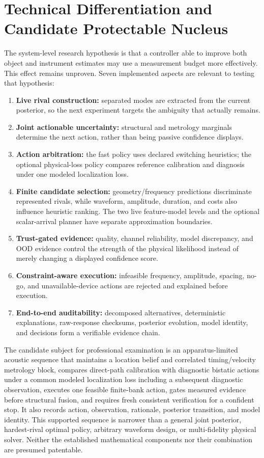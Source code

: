 \documentclass[conference]{IEEEtran}
\begin{document}
\section{Technical Differentiation and Candidate Protectable Nucleus}
The system-level research hypothesis is that a controller able to improve both object and instrument estimates may use a measurement budget more effectively. This effect remains unproven. Seven implemented aspects are relevant to testing that hypothesis:
\begin{enumerate}
    \item \textbf{Live rival construction:} separated modes are extracted from the current posterior, so the next experiment targets the ambiguity that actually remains.
    \item \textbf{Joint actionable uncertainty:} structural and metrology marginals determine the next action, rather than being passive confidence displays.
    \item \textbf{Action arbitration:} the fast policy uses declared switching heuristics; the optional physical-loss policy compares reference calibration and diagnosis under one modeled localization loss.
    \item \textbf{Finite candidate selection:} geometry/frequency predictions discriminate represented rivals, while waveform, amplitude, duration, and costs also influence heuristic ranking. The two live feature-model levels and the optional scalar-arrival planner have separate approximation boundaries.
    \item \textbf{Trust-gated evidence:} quality, channel reliability, model discrepancy, and OOD evidence control the strength of the physical likelihood instead of merely changing a displayed confidence score.
    \item \textbf{Constraint-aware execution:} infeasible frequency, amplitude, spacing, no-go, and unavailable-device actions are rejected and explained before execution.
    \item \textbf{End-to-end auditability:} decomposed alternatives, deterministic explanations, raw-response checksums, posterior evolution, model identity, and decisions form a verifiable evidence chain.
\end{enumerate}

The candidate subject for professional examination is an apparatus-limited acoustic sequence that maintains a location belief and correlated timing/velocity metrology block, compares direct-path calibration with diagnostic bistatic actions under a common modeled localization loss including a subsequent diagnostic observation, executes one feasible finite-bank action, gates measured evidence before structural fusion, and requires fresh consistent verification for a confident stop. It also records action, observation, rationale, posterior transition, and model identity. This supported sequence is narrower than a general joint posterior, hardest-rival optimal policy, arbitrary waveform design, or multi-fidelity physical solver. Neither the established mathematical components nor their combination are presumed patentable.
\end{document}
